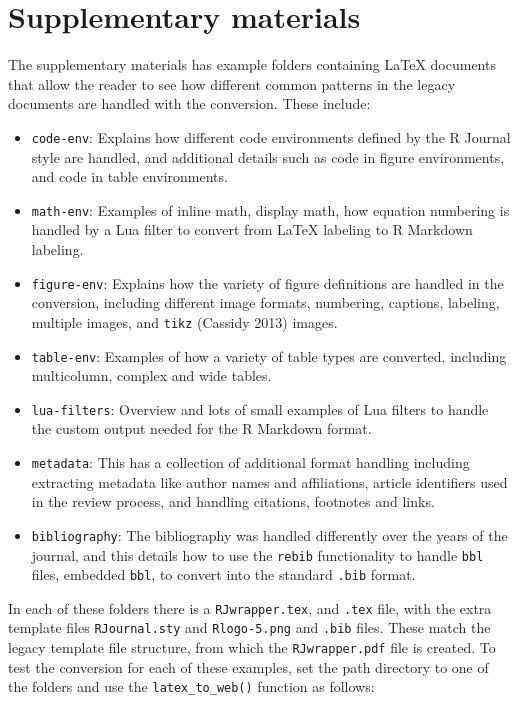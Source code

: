 \hypertarget{supplementary-materials}{%
\section*{Supplementary materials}\label{supplementary-materials}}

The supplementary materials has example folders containing LaTeX documents that allow the reader to see how different common patterns in the legacy documents are handled with the conversion. These include:

\begin{itemize}
\tightlist
\item
  \texttt{code-env}: Explains how different code environments defined by the R Journal style are handled, and additional details such as code in figure environments, and code in table environments.
\item
  \texttt{math-env}: Examples of inline math, display math, how equation numbering is handled by a Lua filter to convert from LaTeX labeling to R Markdown labeling.
\item
  \texttt{figure-env}: Explains how the variety of figure definitions are handled in the conversion, including different image formats, numbering, captions, labeling, multiple images, and \texttt{tikz} (Cassidy 2013) images.
\item
  \texttt{table-env}: Examples of how a variety of table types are converted, including multicolumn, complex and wide tables.
\item
  \texttt{lua-filters}: Overview and lots of small examples of Lua filters to handle the custom output needed for the R Markdown format.
\item
  \texttt{metadata}: This has a collection of additional format handling including extracting metadata like author names and affiliations, article identifiers used in the review process, and handling citations, footnotes and links.
\item
  \texttt{bibliography}: The bibliography was handled differently over the years of the journal, and this details how to use the \texttt{rebib} functionality to handle \texttt{bbl} files, embedded \texttt{bbl}, to convert into the standard \texttt{.bib} format.
\end{itemize}

In each of these folders there is a \texttt{RJwrapper.tex}, and \texttt{.tex} file, with the extra template files \texttt{RJournal.sty} and \texttt{Rlogo-5.png} and \texttt{.bib} files. These match the legacy template file structure, from which the \texttt{RJwrapper.pdf} file is created. To test the conversion for each of these examples, set the path directory to one of the folders and use the \texttt{latex\_to\_web()} function as follows:

